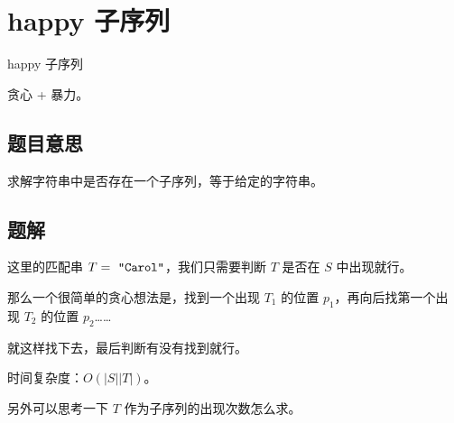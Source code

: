 \def\sectionName{happy 子序列}
\section{\sectionName}



\begin{frame}

\isBeamerMode\relax
    {\Huge \sectionName}\par
\fi




贪心 + 暴力。



\end{frame}

\subsection{题目意思}
\begin{frame} %
求解字符串中是否存在一个子序列，等于给定的字符串。
\end{frame}



\subsection{题解}
\begin{frame} %
这里的匹配串 $T = \text{ \texttt{"Carol"}}$，我们只需要判断 $T$ 是否在 $S$ 中出现就行。

那么一个很简单的贪心想法是，找到一个出现 $T_1$ 的位置 $p_1$，再向后找第一个出
现 $T_2$ 的位置 $p_2$……

就这样找下去，最后判断有没有找到就行。

时间复杂度：$O(|S||T|)$。

另外可以思考一下 $T$ 作为子序列的出现次数怎么求。
\end{frame}

